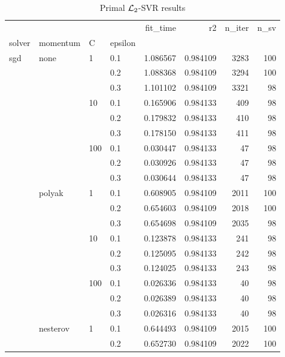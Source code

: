 \begin{table}[H]
\centering
\caption{Primal $\protect \mathcal{L}_2$-SVR results}
\label{primal_l2_svr_cv_results}
\begin{tabular}{llllrrrr}
\toprule
          &   &     &     &  fit\_time &        r2 &  n\_iter &  n\_sv \\
solver & momentum & C & epsilon &           &           &         &       \\
\midrule
sgd & none & 1   & 0.1 &  1.086567 &  0.984109 &    3283 &   100 \\
          &   &     & 0.2 &  1.088368 &  0.984109 &    3294 &   100 \\
          &   &     & 0.3 &  1.101102 &  0.984109 &    3321 &    98 \\
          &   & 10  & 0.1 &  0.165906 &  0.984133 &     409 &    98 \\
          &   &     & 0.2 &  0.179832 &  0.984133 &     410 &    98 \\
          &   &     & 0.3 &  0.178150 &  0.984133 &     411 &    98 \\
          &   & 100 & 0.1 &  0.030447 &  0.984133 &      47 &    98 \\
          &   &     & 0.2 &  0.030926 &  0.984133 &      47 &    98 \\
          &   &     & 0.3 &  0.030644 &  0.984133 &      47 &    98 \\
          & polyak & 1   & 0.1 &  0.608905 &  0.984109 &    2011 &   100 \\
          &   &     & 0.2 &  0.654603 &  0.984109 &    2018 &   100 \\
          &   &     & 0.3 &  0.654698 &  0.984109 &    2035 &    98 \\
          &   & 10  & 0.1 &  0.123878 &  0.984133 &     241 &    98 \\
          &   &     & 0.2 &  0.125095 &  0.984133 &     242 &    98 \\
          &   &     & 0.3 &  0.124025 &  0.984133 &     243 &    98 \\
          &   & 100 & 0.1 &  0.026336 &  0.984133 &      40 &    98 \\
          &   &     & 0.2 &  0.026389 &  0.984133 &      40 &    98 \\
          &   &     & 0.3 &  0.026316 &  0.984133 &      40 &    98 \\
          & nesterov & 1   & 0.1 &  0.644493 &  0.984109 &    2015 &   100 \\
          &   &     & 0.2 &  0.652730 &  0.984109 &    2022 &   100 \\

\end{tabular}
\end{table}

